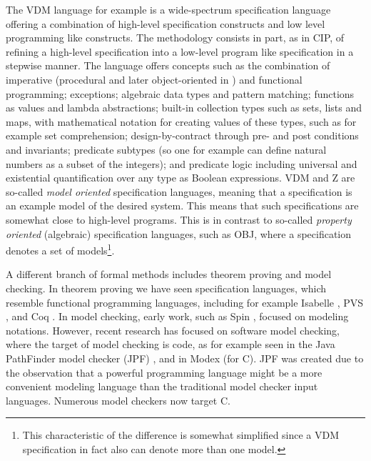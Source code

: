 The VDM language for example is a wide-spectrum specification 
language offering a combination of high-level specification 
constructs and low level programming like constructs. The 
methodology 
consists in part, as in CIP, of refining a high-level specification 
into a low-level program like specification in a stepwise manner. 
The language offers concepts 
such as the combination of imperative (procedural and later 
object-oriented in \vdmpp) and functional programming; exceptions; 
algebraic data types and pattern matching; functions as values and 
lambda abstractions; built-in collection types such as sets, lists 
and maps, with mathematical notation for creating values of these 
types, such as for example set comprehension; design-by-contract 
through pre- and post conditions and invariants; predicate subtypes 
(so one for example can define natural numbers as a subset of the 
integers);  and predicate logic including universal and existential 
quantification over any type as Boolean expressions.  VDM and Z are 
so-called {\em model oriented} specification languages, 
meaning that a specification is an example model of the desired system. This means that such specifications are somewhat close to high-level programs. This is in contrast to so-called {\em property oriented} (algebraic) specification languages, such as OBJ, where a specification denotes a set of models\footnote{This characteristic of the difference is somewhat simplified since a VDM specification in fact also can denote more than one model.}.  

A different branch of formal methods includes theorem proving and 
model checking. In theorem proving we have seen specification 
languages, which resemble functional programming languages, 
including for example Isabelle \cite{isabelle}, PVS \cite{pvs}, and Coq \cite{coq}. In model checking, early 
work, such as Spin \cite{holzmann-spin-2004}, 
focused on modeling notations. However, recent research has 
focused on 
software model checking, where the target of model checking is 
code, as for example seen in the Java PathFinder model checker 
(JPF) \cite{havelund-jpf-00,havelund-visser02}, and in 
Modex \cite{holzmann-spin-2004} (for C). 
JPF was created due to the observation that a powerful 
programming language might be a more convenient 
modeling language than the 
traditional model checker input languages. Numerous 
model checkers now target C.

